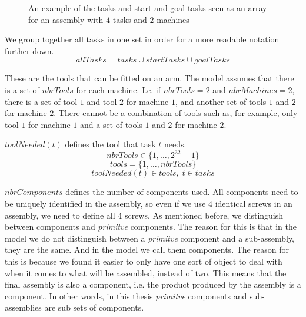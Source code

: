 \begin{figure}
	\centering
	
	\caption{An example of the tasks and start and goal tasks seen as an array for an assembly with $4$ tasks and $2$ machines}
	\label{fig:tasks_array}
\end{figure}

\noindent We group together all tasks in one set in order for a more readable notation further down.
 \begin{equation}\label{eq:21}
 allTasks = tasks \cup startTasks \cup goalTasks
 \end{equation}

  \noindent These are the tools that can be fitted on an arm. The model assumes that there is a set of $nbrTools$ for each machine. I.e. if $nbrTools = 2$ and $nbrMachines = 2$, there is a set of tool $1$ and tool $2$ for machine $1$, and another set of tools $1$ and $2$ for machine $2$. There cannot be a combination of tools such as, for example, only tool $1$ for machine $1$ and a set of tools $1$ and $2$ for machine $2$.
 
 $toolNeeded(t)$ defines the tool that task $t$ needs.
 \begin{equation}\label{eq:3}
 nbrTools \in \{1 , \ldots , 2^{32}-1\}
 \end{equation}
 \begin{equation}\label{eq:12}
 tools = \{1 , \ldots , nbrTools\}
 \end{equation}
 \begin{equation}\label{eq:33}
 toolNeeded(t) \in tools, \; t \in tasks
 \end{equation} 

  \noindent $nbrComponents$ defines the number of components used. All components need to be uniquely identified in the assembly, so even if we use 4 identical screws in an assembly, we need to define all 4 screws. As mentioned before, we distinguish between components and \emph{primitve} components. The reason for this is that in the model we do not distinguish between a \emph{primitve} component and a sub-assembly, they are the same. And in the model we call them components. The reason for this is because we found it easier to only have one sort of object to deal with when it comes to what will be assembled, instead of two. This means that the final assembly is also a component, i.e. the product produced by the assembly is a component. In other words, in this thesis \emph{primitve} components and sub-assemblies are sub sets of components.
  
